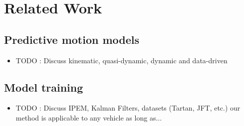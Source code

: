 \section{Related Work}

\lightlipsum[1]

\subsection{Predictive motion models}

\begin{itemize}
	\item TODO : Discuss kinematic, quasi-dynamic, dynamic and data-driven
\end{itemize}

\lightlipsum[1-3]

\subsection{Model training}

\begin{itemize}
	\item TODO : Discuss IPEM, Kalman Filters, datasets (Tartan, JFT, etc.) our method is applicable to any vehicle as long as...
\end{itemize}

\lightlipsum[1-3]
